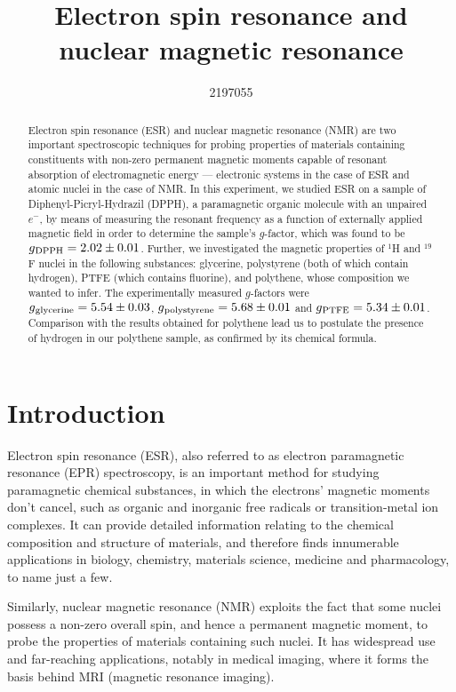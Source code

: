 \documentclass[a4paper]{jpconf}
\numberwithin{equation}{section}
\begin{document}
\title{Electron spin resonance and nuclear magnetic resonance}

\author{2197055}


\begin{abstract}
Electron spin resonance (ESR) and nuclear magnetic resonance (NMR) are two important spectroscopic techniques for probing properties of materials containing constituents with non-zero permanent magnetic moments capable of resonant absorption of electromagnetic energy --- electronic systems in the case of ESR and atomic nuclei in the case of NMR. In this experiment, we studied ESR on a sample of Diphenyl-Picryl-Hydrazil (DPPH), a paramagnetic organic molecule with an unpaired $e^-$, by means of measuring the resonant frequency as a function of externally applied magnetic field in order to determine the sample\textquoteright s $g$-factor, which was found to be $g\textsubscript{DPPH} = 2.02 \pm 0.01$.
Further, we investigated the magnetic properties of ${}^1$H and ${}^{19}$F nuclei in the following substances: glycerine, polystyrene (both of which contain hydrogen), PTFE (which contains fluorine), and polythene, whose composition we wanted to infer. The experimentally measured $g$-factors were $g\textsubscript{glycerine} = 5.54 \pm 0.03$, $g\textsubscript{polystyrene} = 5.68 \pm 0.01$ and $g\textsubscript{PTFE} = 5.34 \pm 0.01$. Comparison with the results obtained for polythene lead us to postulate the presence of hydrogen in our polythene sample, as confirmed by its chemical formula.

\end{abstract}

\section{Introduction}
Electron spin resonance (ESR), also referred to as electron paramagnetic resonance (EPR) spectroscopy,      %
is an important method for studying paramagnetic chemical substances, in which the electrons' magnetic moments don't cancel, such as organic and inorganic free radicals or transition-metal ion complexes. It can provide detailed information relating to the chemical composition and structure of materials, and therefore finds innumerable applications in biology, chemistry, materials science, medicine and pharmacology, to name just a few.

Similarly, nuclear magnetic resonance (NMR) exploits the fact that some nuclei possess a non-zero overall spin, and hence a permanent magnetic moment, to probe the properties of materials containing such nuclei. It has widespread use and far-reaching applications, notably in medical imaging, where it forms the basis behind MRI (magnetic resonance imaging).
\end{document}
